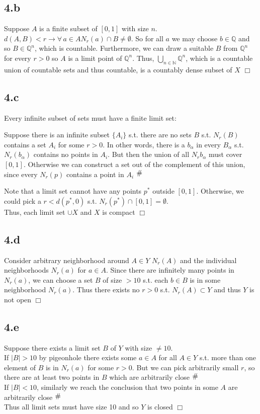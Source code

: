 \documentclass{article}
\newcommand{\contra}{\raisebox{\depth}{\#}}
\begin{document}
\subsection*{4.b}
Suppose $A$ is a finite subset of $[0,1]$ with size $n$.
$d(A,B) < r \rightarrow \forall \, a \in A N_r (a) \cap B \neq \emptyset$. So for all $a$ we may choose $b \in \mathbb{Q}$ and so $B \in \mathbb{Q}^n$, which is countable. Furthermore, we can draw a suitable $B$ from $\mathbb{Q}^n$ for every $r>0$ so $A$ is a limit point of $\mathbb{Q}^n$. Thus, $\bigcup\limits_{n \in \mathbb{N}} \mathbb{Q}^n$, which is a countable union of countable sets and thus countable, is a countably dense subset of $X$ $\Box$

\subsection*{4.c}
Every infinite subset of sets must have a finite limit set:
\begin{adjustwidth}{0.5cm}{}
Suppose there is an infinite subset $\{A_i\}$ s.t. there are no sets $B$ s.t. $N_r (B)$ contains a set $A_i$ for some $r>0$. In other words, there is a $b_\alpha$ in every $B_\alpha$ s.t. $N_r (b_\alpha)$ contains no points in $A_i$. But then the union of all $N_r {b_\alpha}$ must cover $[0,1]$. Otherwise we can construct a set out of the complement of this union, since every $N_r (p)$ contains a point in $A_i$ $\contra$
\end{adjustwidth}
Note that a limit set cannot have any points $p^*$ outside $[0,1]$. Otherwise, we could pick a $r<d(p^*,0)$ s.t. $N_r (p^*) \cap [0,1] = \emptyset$.\\
Thus, each limit set $\cup X$ and $X$ is compact $\Box$

\subsection*{4.d}
Consider arbitrary neighborhood around $A \in Y$ $N_r (A)$ and the individual neighborhoods $N_r (a)$ for $a \in A$. Since there are infinitely many points in $N_r (a)$, we can choose a set $B$ of size $>10$ s.t. each $b \in B$ is in some neighborhood $N_r (a)$. Thus there exists no $r>0$ s.t. $N_r (A) \subset Y$ and thus $Y$ is not open $\Box$

\subsection*{4.e}
Suppose there exists a limit set $B$ of $Y$ with size $\neq 10$.\\
If $|B|>10$ by pigeonhole there exists some $a \in A$ for all $A \in Y$ s.t. more than one element of $B$ is in $N_r (a)$ for some $r>0$. But we can pick arbitrarily small $r$, so there are at least two points in $B$ which are arbitrarily close $\contra$\\
If $|B|<10$, similarly we reach the conclusion that two points in some $A$ are arbitrarily close $\contra$\\
Thus all limit sets must have size 10 and so $Y$ is closed $\Box$
\end{document}
